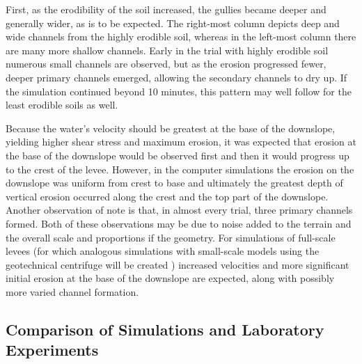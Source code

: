 First, as the erodibility of the soil increased, the gullies became
deeper and generally wider, as is to be expected.  The right-most
column depicts deep and wide channels from the highly erodible soil,
whereas in the left-most column there are many more
shallow channels.  Early in the trial with highly erodible soil numerous small channels are observed, but as the erosion progressed fewer,
deeper primary channels emerged, allowing the secondary channels to
dry up.  If the simulation continued beyond 10 minutes, this
pattern may well follow for the least erodible soils as well.

Because the water's velocity should be greatest at the base of the
downslope, yielding higher shear stress and maximum erosion,
it was expected that erosion at the base of the downslope would be observed first and
then it would progress up to the crest of the levee.  However, in the
computer simulations the erosion on the downslope was uniform from
crest to base and ultimately the greatest depth of vertical erosion
occurred along the crest and the top part of the downslope.  Another
observation of note is that, in almost every trial, three primary
channels formed.
%
Both of these observations may be due to noise added to the
terrain and the overall scale and proportions if the geometry.  For
simulations of full-scale levees (for which analogous
simulations with small-scale models using the geotechnical
centrifuge will be created \cite{Zimmie1995}) 
increased velocities and more significant initial erosion at the base of the downslope
are expected, 
along with possibly more varied channel formation.



\subsection{Comparison of Simulations and Laboratory Experiments}

